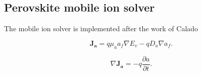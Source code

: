\subsection{Perovskite mobile ion solver}
The mobile ion solver is implemented after the work of Calado \cite{calado2016evidence}

\begin{equation}
\label{eq:pdrive}
\boldsymbol{J_a} = q \mu_a a_{f}  {\nabla E_{v}}  - q D_a {\nabla a_{f}}.
\end{equation}

\begin{equation}
\label{eq:contp}
\nabla \boldsymbol{J_a} = - q \frac{\partial a}{\partial t}.
\end{equation}


